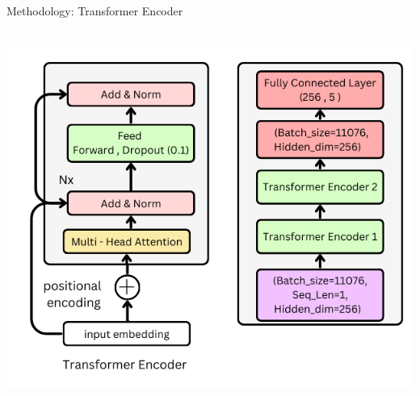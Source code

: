 \begin{frame}{Methodology: Transformer Encoder}
\begin{columns}
        \centering
        \includegraphics[width=\linewidth]{images/paper_3/Transformer.png} %
        \vspace{2pt}

    \end{columns}
\end{frame}

